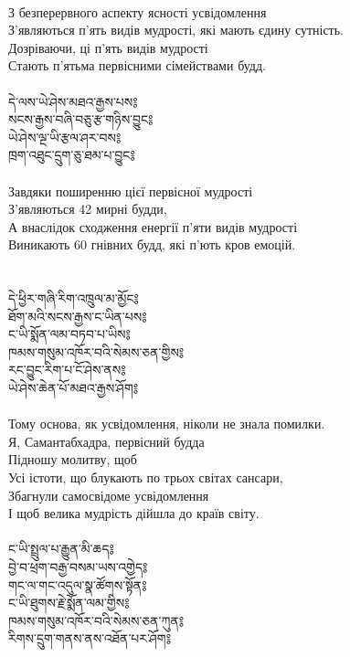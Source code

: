 \\
З безперервного аспекту ясності усвідомлення \\
З'являються п'ять видів мудрості, які мають єдину сутність. \\
Дозріваючи, ці п'ять видів мудрості \\
Стають п'ятьма первісними сімействами будд. \\
\\
{\ti
དེ་ལས་ཡེ་ཤེས་མཐའ་རྒྱས་པས༔ \\
སངས་རྒྱས་བཞི་བཅུ་རྩ་གཉིས་བྱུང༔ \\
ཡེ་ཤེས་ལྔ་ཡི་རྩལ་ཤར་བས༔ \\
ཁྲག་འཐུང་དྲུག་ཅུ་ཐམ་པ་བྱུང༔}\\
\\
Завдяки поширенню цієї первісної мудрості \\
З'являються 42 мирні будди, \\
А внаслідок сходження енергії п'яти видів мудрості \\
Виникають 60 гнівних будд, які п'ють кров емоцій. \\
\\
\newpage
\\
{\ti
དེ་ཕྱིར་གཞི་རིག་འཁྲུལ་མ་མྱོང༔ \\
ཐོག་མའི་སངས་རྒྱས་ང་ཡིན་པས༔ \\
ང་ཡི་སྨོན་ལམ་བཏབ་པ་ཡིས༔ \\
ཁམས་གསུམ་འཁོར་བའི་སེམས་ཅན་གྱིས༔ \\
རང་བྱུང་རིག་པ་ངོ་ཤེས་ནས༔ \\
ཡེ་ཤེས་ཆེན་པོ་མཐའ་རྒྱས་ཤོག༔}\\
\\
Тому основа, як усвідомлення, ніколи не знала помилки. \\
Я, Самантабхадра, первісний будда \\
Підношу молитву, щоб \\
Усі істоти, що блукають по трьох світах сансари, \\
Збагнули самосвідоме усвідомлення \\
І щоб велика мудрість дійшла до країв світу. \\
\\
{\ti
ང་ཡི་སྤྲུལ་པ་རྒྱུན་མི་ཆད༔ \\
བྱེ་བ་ཕྲག་བརྒྱ་བསམ་ཡས་འགྱེད༔ \\
གང་ལ་གང་འདུལ་སྣ་ཚོགས་སྟོན༔ \\
ང་ཡི་ཐུགས་རྗེ་སྨོན་ལམ་གྱིས༔ \\
ཁམས་གསུམ་འཁོར་བའི་སེམས་ཅན་ཀུན༔ \\
རིགས་དྲུག་གནས་ནས་འཐོན་པར་ཤོག༔}\\
